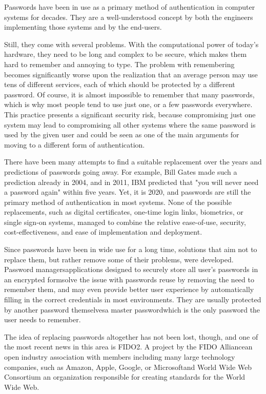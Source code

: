 Passwords have been in use as a primary method of authentication in computer systems for decades.
They are a well-understood concept by both the engineers implementing those systems and by the end-users.

Still, they come with several problems.
With the computational power of today's hardware, they need to be long and complex to be secure,
which makes them hard to remember and annoying to type.
The problem with remembering becomes significantly worse upon the realization that an average person may use tens of different services,
each of which should be protected by a different password.
Of course, it is almost impossible to remember that many passwords, which is why most people tend to use just one, or a few passwords everywhere.
This practice presents a significant security risk, because compromising just one system may lead to compromising all other systems where the same password
is used by the given user and could be seen as one of the main arguments for moving to a different form of authentication.

There have been many attempts to find a suitable replacement over the years and predictions of passwords going away.
For example, Bill Gates made such a prediction already in 2004, and in 2011, IBM predicted that "you will never need a password again" within five years.
Yet, it is 2020, and passwords are still the primary method of authentication in most systems.
None of the possible replacements, such as digital certificates, one-time login links, biometrics, or single sign-on systems,
managed to combine the relative ease-of-use, security, cost-effectiveness, and ease of implementation and deployment.

Since passwords have been in wide use for a long time, solutions that aim not to replace them,
but rather remove some of their problems, were developed. Password managers\textemdash applications designed
to securely store all user's passwords in an encrypted form\textemdash solve the issue with passwords
reuse by removing the need to remember them, and may even provide better user experience by automatically filling in the correct credentials in most environments.
They are usually protected by another password themselves\textemdash a master password\textemdash which is the only password the user needs to remember.

The idea of replacing passwords altogether has not been lost, though,
and one of the most recent news in this area is FIDO2. A project by the FIDO Alliance\textemdash an open industry association with members including
many large technology companies, such as Amazon, Apple, Google, or Microsoft\textemdash and World Wide Web Consortium\textemdash
an organization responsible for creating standards for the World Wide Web.

